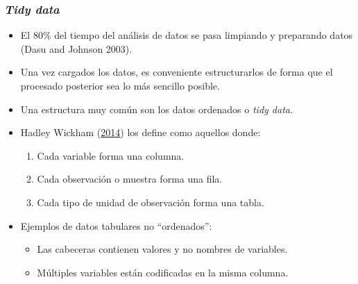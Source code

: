 \documentclass{beamer}
\begin{document}
\begin{frame}
\frametitle{\textit{Tidy data}}

\begin{itemize}
\item El 80\% del tiempo del análisis de datos se pasa limpiando y preparando datos (Dasu and Johnson 2003).

\item Una vez cargados los datos, es conveniente estructurarlos de forma que el procesado posterior sea lo más sencillo posible.

\item Una estructura muy común son los datos ordenados o \textit{tidy data}.

\item Hadley Wickham (\href{http://vita.had.co.nz/papers/tidy-data.pdf}{2014}) los define como aquellos donde:

\begin{enumerate}
\item Cada variable forma una columna.
\item Cada observación o muestra forma una fila.
\item Cada tipo de unidad de observación forma una tabla.
\end{enumerate}

\item Ejemplos de datos tabulares no ``ordenados'':
\begin{itemize}
\item Las cabeceras contienen valores y no nombres de variables.
\item Múltiples variables están codificadas en la misma columna.
\end{itemize}
\end{itemize}
\end{frame}
\end{document}
